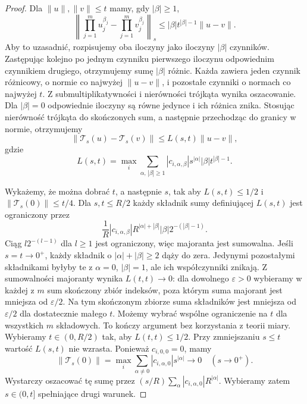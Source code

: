 \begin{proof}
Dla $\|u\|,\|v\|\le t$ mamy, gdy $|\beta|\ge1$,
\[
 \left\|\prod_{j=1}^m u_j^{\beta_j}
       -\prod_{j=1}^m v_j^{\beta_j}\right\|_s
 \le |\beta|t^{|\beta|-1}\|u-v\|.
\]
Aby to uzasadnić, rozpisujemy oba iloczyny
jako iloczyny $|\beta|$ czynników.
Zastępując kolejno po jednym czynniku
pierwszego iloczynu odpowiednim czynnikiem
drugiego, otrzymujemy sumę $|\beta|$
różnic. Każda zawiera jeden czynnik różnicowy,
o normie co najwyżej $\|u-v\|$, i pozostałe
czynniki o normach co najwyżej $t$.
Z submultiplikatywności i nierówności
trójkąta wynika oszacowanie.
Dla $|\beta|=0$ odpowiednie iloczyny są
równe jedynce i ich różnica znika.
Stosując nierówność trójkąta do skończonych
sum, a następnie przechodząc do granicy
w normie, otrzymujemy
\[
 \|\mathcal T_s(u)-\mathcal T_s(v)\|
 \le L(s,t)\|u-v\|,
\]
gdzie
\[
 L(s,t)=\max_i\sum_{\alpha,\,|\beta|\ge1}
 |c_{i,\alpha,\beta}|s^{|\alpha|}
 |\beta|t^{|\beta|-1}.
\]

Wykażemy, że można dobrać $t$, a następnie $s$,
tak aby $L(s,t)\le1/2$ i
$\|\mathcal T_s(0)\|\le t/4$.
Dla $s,t\le R/2$ każdy składnik sumy
definiującej $L(s,t)$ jest ograniczony przez
\[
 \frac{1}{R}|c_{i,\alpha,\beta}|
 R^{|\alpha|+|\beta|}
 |\beta|2^{-(|\beta|-1)}.
\]
Ciąg $l2^{-(l-1)}$ dla $l\ge1$ jest
ograniczony, więc majoranta jest sumowalna.
Jeśli $s=t\to0^+$, każdy składnik
o $|\alpha|+|\beta|\ge2$ dąży do zera.
Jedynymi pozostałymi składnikami
byłyby te z $\alpha=0$, $|\beta|=1$,
ale ich współczynniki znikają.
Z sumowalności majoranty wynika $L(t,t)\to0$:
dla dowolnego $\varepsilon>0$ wybieramy
w każdej z $m$ sum skończony zbiór indeksów,
poza którym suma majorant jest mniejsza
od $\varepsilon/2$. Na tym skończonym zbiorze
suma składników jest mniejsza od $\varepsilon/2$
dla dostatecznie małego $t$. Możemy wybrać
wspólne ograniczenie na $t$ dla wszystkich
$m$ składowych. To kończy argument bez
korzystania z teorii miary.
Wybieramy $t\in(0,R/2)$ tak, aby
$L(t,t)\le1/2$. Przy zmniejszaniu $s\le t$
wartość $L(s,t)$ nie wzrasta.
Ponieważ $c_{i,0,0}=0$, mamy
\[
 \|\mathcal T_s(0)\|
 =\max_i\sum_{\alpha\ne0}
 |c_{i,\alpha,0}|s^{|\alpha|}\longrightarrow0
 \quad(s\to0^+).
\]
Wystarczy oszacować tę sumę przez
$(s/R)\sum_\alpha |c_{i,\alpha,0}|R^{|\alpha|}$.
Wybieramy zatem $s\in(0,t]$ spełniające
drugi warunek.


\end{proof}
